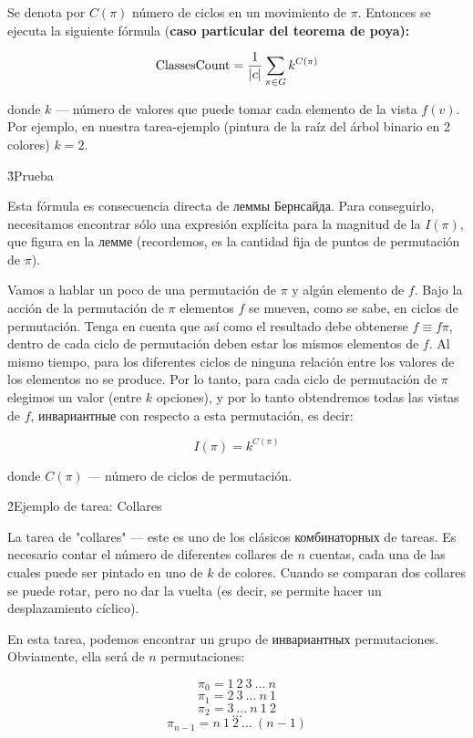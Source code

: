 Se denota por $C(\pi)$ número de ciclos en un movimiento de $\pi$. Entonces se ejecuta la siguiente fórmula (\bf{caso particular del teorema de poya}):

$$ {\rm ClassesCount} = \frac{1}{|c|} \sum_{\pi \in G} k^{ C(\pi) } $$

donde $k$ --- número de valores que puede tomar cada elemento de la vista $f(v)$. Por ejemplo, en nuestra tarea-ejemplo (pintura de la raíz del árbol binario en 2 colores) $k = 2$.

\h3{Prueba}

Esta fórmula es consecuencia directa de леммы Бернсайда. Para conseguirlo, necesitamos encontrar sólo una expresión explícita para la magnitud de la $I(\pi)$, que figura en la лемме (recordemos, es la cantidad fija de puntos de permutación de $\pi$).

Vamos a hablar un poco de una permutación de $\pi$ y algún elemento de $f$. Bajo la acción de la permutación de $\pi$ elementos $f$ se mueven, como se sabe, en ciclos de permutación. Tenga en cuenta que así como el resultado debe obtenerse $f \equiv f \pi$, dentro de cada ciclo de permutación deben estar los mismos elementos de $f$. Al mismo tiempo, para los diferentes ciclos de ninguna relación entre los valores de los elementos no se produce. Por lo tanto, para cada ciclo de permutación de $\pi$ elegimos un valor (entre $k$ opciones), y por lo tanto obtendremos todas las vistas de $f$, инвариантные con respecto a esta permutación, es decir:

$$ I(\pi) = k ^ {C(\pi)} $$

donde $C(\pi)$ --- número de ciclos de permutación.

\h2{Ejemplo de tarea: Collares}

La tarea de "collares" --- este es uno de los clásicos комбинаторных de tareas. Es necesario contar el número de diferentes collares de $n$ cuentas, cada una de las cuales puede ser pintado en uno de $k$ de colores. Cuando se comparan dos collares se puede rotar, pero no dar la vuelta (es decir, se permite hacer un desplazamiento cíclico).

En esta tarea, podemos encontrar un grupo de инвариантных permutaciones. Obviamente, ella será de $n$ permutaciones:

$$ \pi_0 = 1\ 2\ 3\ \ldots\ n $$
$$ \pi_1 = 2\ 3\ \ldots\ n\ 1 $$
$$ \pi_2 = 3\ \ldots\ n\ 1\ 2 $$
$$ \ldots $$
$$ \pi_{n-1} = n\ 1\ 2\ \ldots\ (n-1) $$

